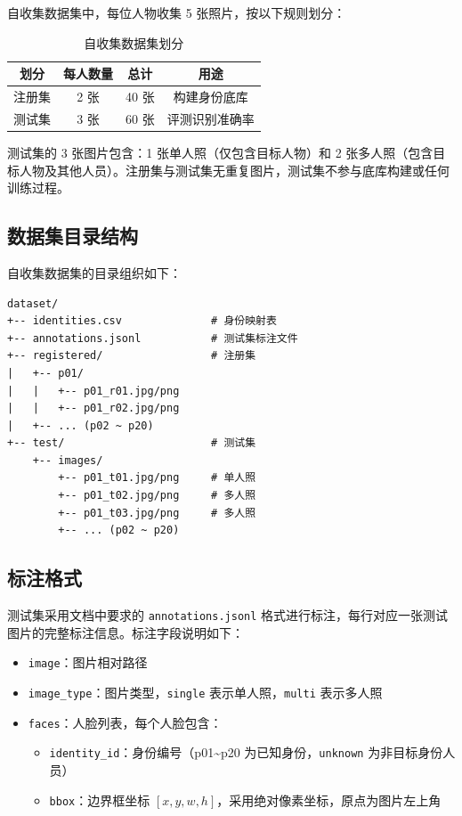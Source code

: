 \documentclass[12pt, a4paper]{article}
\begin{document}
自收集数据集中，每位人物收集 5 张照片，按以下规则划分：

\begin{table}[H]
\centering
\caption{自收集数据集划分}
\label{tab:dataset-split}
\begin{tabular}{cccc}
\toprule
划分 & 每人数量 & 总计 & 用途 \\
\midrule
注册集 & 2 张 & 40 张 & 构建身份底库 \\
测试集 & 3 张 & 60 张 & 评测识别准确率 \\
\bottomrule
\end{tabular}
\end{table}

测试集的 3 张图片包含：1 张单人照（仅包含目标人物）和 2 张多人照（包含目标人物及其他人员）。注册集与测试集无重复图片，测试集不参与底库构建或任何训练过程。

\subsection{数据集目录结构}

自收集数据集的目录组织如下：

\begin{lstlisting}[language={}, caption={数据集目录结构}, label={lst:dataset-structure}]
dataset/
+-- identities.csv              # 身份映射表
+-- annotations.jsonl           # 测试集标注文件
+-- registered/                 # 注册集
|   +-- p01/
|   |   +-- p01_r01.jpg/png
|   |   +-- p01_r02.jpg/png
|   +-- ... (p02 ~ p20)
+-- test/                       # 测试集
    +-- images/
        +-- p01_t01.jpg/png     # 单人照
        +-- p01_t02.jpg/png     # 多人照
        +-- p01_t03.jpg/png     # 多人照
        +-- ... (p02 ~ p20)
\end{lstlisting}

\subsection{标注格式}

测试集采用文档中要求的 \texttt{annotations.jsonl} 格式进行标注，每行对应一张测试图片的完整标注信息。标注字段说明如下：

\begin{itemize}
  \item \texttt{image}：图片相对路径
  \item \texttt{image\_type}：图片类型，\texttt{single} 表示单人照，\texttt{multi} 表示多人照
  \item \texttt{faces}：人脸列表，每个人脸包含：
  \begin{itemize}
    \item \texttt{identity\_id}：身份编号（p01\~{}p20 为已知身份，\texttt{unknown} 为非目标身份人员）
    \item \texttt{bbox}：边界框坐标 $[x, y, w, h]$，采用绝对像素坐标，原点为图片左上角
  \end{itemize}
\end{itemize}
\end{document}
